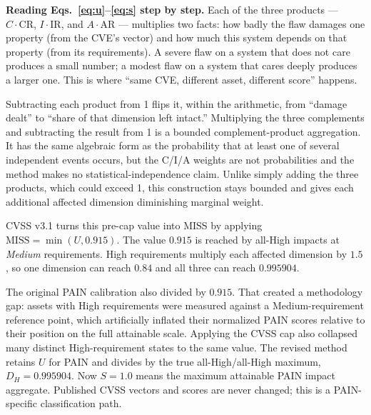 \documentclass[11pt]{article}
\begin{document}
\begin{plain}
\textbf{Reading Eqs.~\eqref{eq:u}--\eqref{eq:s} step by step.}
Each of the three products --- $C\!\cdot\!\mathrm{CR}$,
$I\!\cdot\!\mathrm{IR}$, and $A\!\cdot\!\mathrm{AR}$ --- multiplies two facts:
how badly the flaw damages one property (from the CVE's vector) and how much this
system depends on that property (from its requirements). A severe flaw on a system
that does not care produces a small number; a modest flaw on a system that cares
deeply produces a larger one. This is where ``same CVE, different asset, different
score'' happens.

Subtracting each product from 1 flips it, within the arithmetic, from ``damage
dealt'' to ``share of that dimension left intact.'' Multiplying the three
complements and subtracting the result from 1 is a bounded complement-product
aggregation. It has the same algebraic form as the probability that at least one
of several independent events occurs, but the C/I/A weights are not probabilities
and the method makes no statistical-independence claim. Unlike simply adding the
three products, which could exceed 1, this construction stays bounded and gives
each additional affected dimension diminishing marginal weight.

CVSS v3.1 turns this pre-cap value into MISS by applying
$\mathrm{MISS}=\min(U,0.915)$. The value $0.915$ is reached by all-High impacts at
\emph{Medium} requirements. High requirements multiply each affected dimension
by $1.5$, so one dimension can reach $0.84$ and all three can reach $0.995904$.

The original PAIN calibration also divided by $0.915$. That created a methodology
gap: assets with High requirements were measured against a Medium-requirement
reference point, which artificially inflated their normalized PAIN scores relative
to their position on the full attainable scale. Applying the CVSS cap also collapsed many
distinct High-requirement states to the same value. The revised method retains
$U$ for PAIN and divides by the true all-High/all-High maximum, $D_H=0.995904$.
Now $S=1.0$ means the maximum attainable PAIN impact aggregate. Published CVSS
vectors and scores are never changed; this is a PAIN-specific classification path.
\end{plain}
\end{document}
